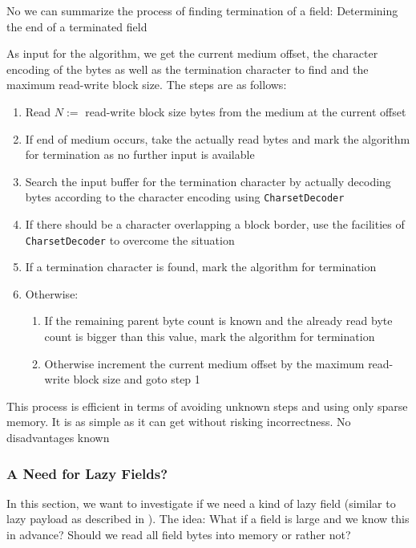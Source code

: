 No we can summarize the process of finding termination of a field:
{%
Determining the end of a terminated field
}
{%
  As input for the algorithm, we get the current medium offset, the character encoding of the bytes as well as the termination character to find and the maximum read-write block size. The steps are as follows:
  \begin{enumerate}
  \item Read $N:=$ read-write block size bytes from the medium at the current offset
  \item If end of medium occurs, take the actually read bytes and mark the algorithm for termination as no further input is available
  \item Search the input buffer for the termination character by actually decoding bytes according to the character encoding using \texttt{CharsetDecoder}
  \item If there should be a character overlapping a block border, use the facilities of \texttt{CharsetDecoder} to overcome the situation
  \item If a termination character is found, mark the algorithm for termination
  \item Otherwise:
    \begin{enumerate}
    \item If the remaining parent byte count is known and the already read byte count is bigger than this value, mark the algorithm for termination 
    \item Otherwise increment the current medium offset by the maximum read-write block size and goto step 1
    \end{enumerate}
  \end{enumerate}
}
{%
This process is efficient in terms of avoiding unknown steps and using only sparse memory. It is as simple as it can get without risking incorrectness.
}
{%
No disadvantages known
}

\subsubsection{A Need for Lazy Fields?}%
\label{sec:LazyFields}%

In this section, we want to investigate if we need a kind of lazy field (similar to lazy payload as described in ). The idea: What if a field is large and we know this in advance? Should we read all field bytes into memory or rather not?

